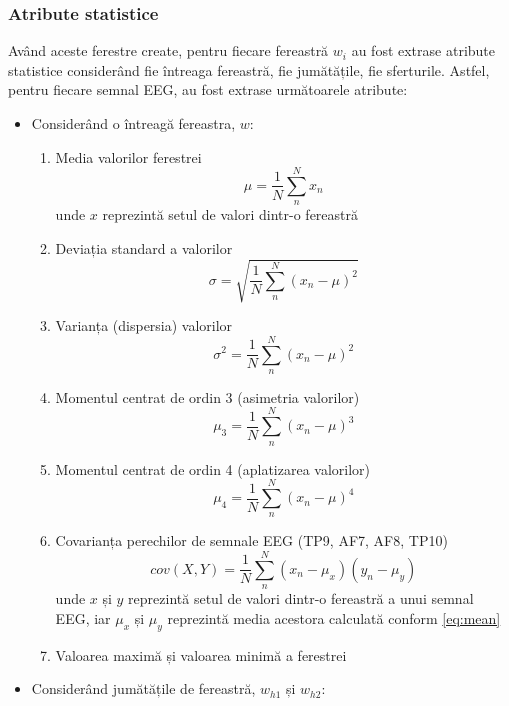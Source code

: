 \subsubsection*{Atribute statistice}
Având aceste ferestre create, pentru fiecare fereastră $w_i$ au fost extrase atribute statistice considerând fie întreaga fereastră, fie jumătățile, fie sferturile. Astfel, pentru fiecare semnal EEG, au fost extrase următoarele atribute:
\begin{itemize}
	\item Considerând o întreagă fereastra, $w$:
	\begin{enumerate}
	\item Media valorilor ferestrei
	\begin{equation}
	\mu = \frac{1}{N}\sum_n^N x_n
	\label{eq:mean}
	\end{equation}
	unde $x$ reprezintă setul de valori dintr-o fereastră
	\item Deviația standard a valorilor
	\begin{equation}
	\sigma = \sqrt{\frac{1}{N}\sum_n^N(x_n - \mu)^2}
	\end{equation}
	\item Varianța (dispersia) valorilor
	\begin{equation}
	\sigma^2 = \frac{1}{N}\sum_n^N(x_n - \mu)^2
	\end{equation}
	\item Momentul centrat de ordin 3 (asimetria valorilor) 
	\begin{equation}
	\mu_3 = \frac{1}{N}\sum_n^N(x_n - \mu)^3
	\end{equation}
	\item Momentul centrat de ordin 4 (aplatizarea valorilor)
	\begin{equation}
	\mu_4 = \frac{1}{N}\sum_n^N(x_n - \mu)^4
	\end{equation}
	\item Covarianța perechilor de semnale EEG (TP9, AF7, AF8, TP10)
	\begin{equation}
	cov(X,Y) = \frac{1}{N}\sum_n^N(x_n - \mu_x)(y_n - \mu_y)
	\end{equation}
	unde $x$ și $y$ reprezintă setul de valori dintr-o fereastră a unui semnal EEG, iar $\mu_x$ și $\mu_y$ reprezintă media acestora calculată conform \eqref{eq:mean}
	\item Valoarea maximă și valoarea minimă a ferestrei
	\end{enumerate}
	\item Considerând jumătățile de fereastră, $w_{h1}$ și $w_{h2}$:

\end{itemize}
